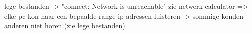 lege bestanden -> "connect: Network is unreachable"
zie netwerk calculator => elke pc kon naar een bepaalde range ip adressen luisteren -> sommige konden anderen niet horen (zie lege bestanden)